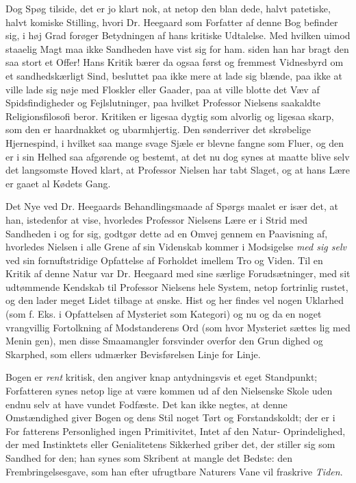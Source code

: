 \documentclass[12pt,a4paper,openany]{book}
\newcommand{\opage}[1]{\marginnote{\footnotesize\textit{[#1]}}}
\begin{document}
Dog Spøg tilside, det er jo klart nok, at netop den blan\-%
dede, halvt patetiske, halvt komiske Stilling, hvori Dr. Heegaard
som Forfatter af denne Bog befinder sig, i høj Grad forøger
Betydningen af hans kritiske Udtalelse. Med hvilken uimod\-%
staaelig Magt maa ikke Sandheden have vist sig for ham. siden
han har bragt den saa stort et Offer! Hans Kritik bærer da
ogsaa først og fremmest Vidnesbyrd om et sandhedskærligt Sind,
besluttet paa ikke mere at lade sig blænde, paa ikke at ville
lade sig nøje med Floskler eller Gaader, paa at ville blotte det
Væv af Spidsfindigheder og Fejlslutninger, paa hvilket Professor
Nielsens saakaldte Religionsfilosofi beror. Kritiken er ligesaa
dygtig som alvorlig og ligesaa skarp, som den er haardnakket
\opage{108}og ubarmhjertig. Den sønderriver det skrøbelige Hjernespind, i
hvilket saa mange svage Sjæle er blevne fangne som Fluer, og
den er i sin Helhed saa afgørende og bestemt, at det nu
dog synes at maatte blive selv det langsomste Hoved klart,
at Professor Nielsen har tabt Slaget, og at hans Lære er gaaet
al Kødets Gang.

Det Nye ved Dr. Heegaards Behandlingsmaade af Spørgs\-%
maalet er især det, at han, istedenfor at vise, hvorledes Professor
Nielsens Lære er i Strid med Sandheden i og for sig, godtgør
dette ad en Omvej gennem en Paavisning af, hvorledes Nielsen
i alle Grene af sin Videnskab kommer i Modsigelse \emph{med sig selv}
ved sin fornuftstridige Opfattelse af Forholdet imellem Tro og
Viden. Til en Kritik af denne Natur var Dr. Heegaard med
sine særlige Forudsætninger, med sit udtømmende Kendskab til
Professor Nielsens hele System, netop fortrinlig rustet, og den
lader meget Lidet tilbage at ønske. Hist og her findes vel
nogen Uklarhed (som f. Eks. i Opfattelsen af Mysteriet som
Kategori) og nu og da en noget vrangvillig Fortolkning af
Modstanderens Ord (som hvor Mysteriet sættes lig med Menin\-%
gen), men disse Smaamangler forsvinder overfor den Grun\-%
dighed og Skarphed, som ellers udmærker Bevisførelsen Linje
for Linje.

Bogen er \emph{rent} kritisk, den angiver knap antydningsvis et
eget Standpunkt; Forfatteren synes netop lige at være kommen
ud af den Nielsenske Skole uden endnu selv at have vundet
Fodfæste. Det kan ikke negtes, at denne Omstændighed giver
Bogen og dens Stil noget Tørt og Forstandskoldt; der er i For\-%
fatterens Personlighed ingen Primitivitet, Intet af den Natur-%
Oprindelighed, der med Instinktets eller Genialitetens Sikkerhed
griber det, der stiller sig som Sandhed for den; han synes som
Skribent at mangle det Bedste: den Frembringelsesgave, som
han efter ufrugtbare Naturers Vane vil fraskrive \emph{Tiden}.
\end{document}
